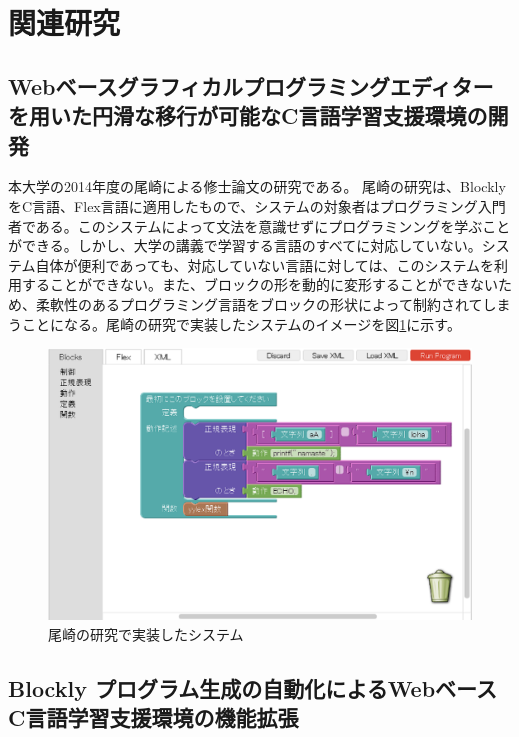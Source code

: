 \documentclass{risepaper}
\begin{document}
    \section{関連研究}
    
    \subsection{Webベースグラフィカルプログラミングエディターを用いた円滑な移行が可能なC言語学習支援環境の開発}
 
 本大学の2014年度の尾崎による修士論文\cite{ozaki}の研究である。
 尾崎の研究は、BlocklyをC言語、Flex言語に適用したもので、システムの対象者はプログラミング入門者である。このシステムによって文法を意識せずにプログラミンングを学ぶことができる。しかし、大学の講義で学習する言語のすべてに対応していない。システム自体が便利であっても、対応していない言語に対しては、このシステムを利用することができない。また、ブロックの形を動的に変形することができないため、柔軟性のあるプログラミング言語をブロックの形状によって制約されてしまうことになる。尾崎の研究で実装したシステムのイメージを図\ref{fig:ozaki}に示す。 


\begin{figure}[h]
\begin{center}
\includegraphics[scale=0.5]{img/ozaki.eps}
\caption{尾崎の研究で実装したシステム}%
\label{fig:ozaki}
\end{center}%
\end{figure}%
 
	\subsection{Blockly プログラム生成の自動化によるWebベースC言語学習支援環境の機能拡張}
 
\end{document}
